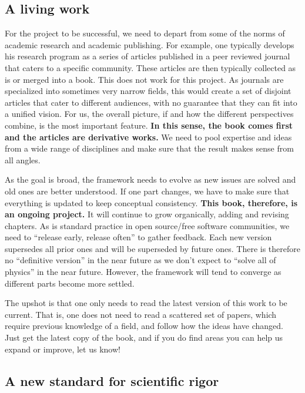 \documentclass[11pt,letterpaper,fleqn]{memoir} %
\begin{document}
\subsection{A living work}

For the project to be successful, we need to depart from some of the norms of academic research and academic publishing. For example, one typically develops his research program as a series of articles published in a peer reviewed journal that caters to a specific community. These articles are then typically collected as is or merged into a book. This does not work for this project. As journals are specialized into sometimes very narrow fields, this would create a set of disjoint articles that cater to different audiences, with no guarantee that they can fit into a unified vision. For us, the overall picture, if and how the different perspectives combine, is the most important feature. \textbf{In this sense, the book comes first and the articles are derivative works.} We need to pool expertise and ideas from a wide range of disciplines and make sure that the result makes sense from all angles.

As the goal is broad, the framework needs to evolve as new issues are solved and old ones are better understood. If one part changes, we have to make sure that everything is updated to keep conceptual consistency. \textbf{This book, therefore, is an ongoing project.} It will continue to grow organically, adding and revising chapters. As is standard practice in open source/free software communities, we need to ``release early, release often'' to gather feedback. Each new version supersedes all prior ones and will be superseded by future ones. There is therefore no ``definitive version'' in the near future as we don't expect to ``solve all of physics'' in the near future. However, the framework will tend to converge as different parts become more settled.

The upshot is that one only needs to read the latest version of this work to be current. That is, one does not need to read a scattered set of papers, which require previous knowledge of a field, and follow how the ideas have changed. Just get the latest copy of the book, and if you do find areas you can help us expand or improve, let us know!

\subsection{A new standard for scientific rigor}
\end{document}
